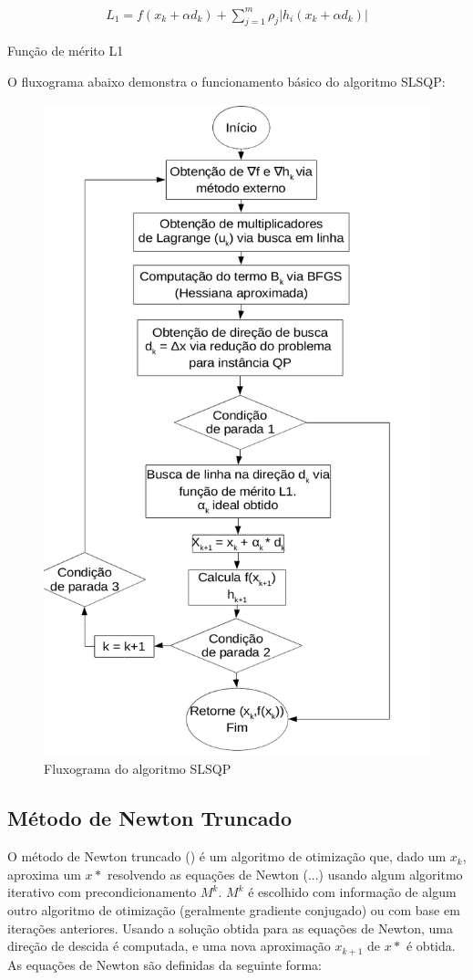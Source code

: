 \documentclass{article}
\begin{document}
\begin{eqfloat}[H]
\begin{equation}
\begin{split}
L_1 = f(x_k + \alpha d_k) + \sum_{j=1}^{m} \rho_j |h_i (x_k + \alpha d_k)|
\end{split}
\end{equation}
\caption{Função de mérito L1}
\label{eqn:L1}
\end{eqfloat}

O fluxograma abaixo demonstra o funcionamento básico do algoritmo SLSQP:



\begin{figure}[H]
  \centering
  \includegraphics[width=0.7\linewidth]{slsqp.png}
  \caption{Fluxograma do algoritmo SLSQP}
\end{figure}


\subsection{Método de Newton Truncado}
O método de Newton truncado (\cite{schlick1987powerful}) é um algoritmo de otimização que, dado um $x_k$, aproxima um $x*$ resolvendo as equações de Newton (...) usando algum algoritmo iterativo com precondicionamento $M^k$. $M^k$ é escolhido com informação de algum outro algoritmo de otimização (geralmente gradiente conjugado) ou com base em iterações anteriores. Usando a solução obtida para as equações de Newton, uma direção de descida é computada, e uma nova aproximação $x_{k+1}$ de $x*$ é obtida. As equações de Newton são definidas da seguinte forma:
\end{document}
